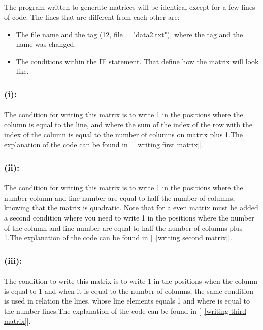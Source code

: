 \documentclass[twocolumn]{article}
\begin{document}
\subsection{}
The program written to generate matrices will be identical except for a few lines of code.
The lines that are different from each other are:
\begin{itemize}
\item The file name and the tag (12, file = "data2.txt"), where the tag and the name was changed.
\item The conditions within the IF statement. That define how the matrix will look like.
\end{itemize}
\subsubsection{(i):}
\paragraph{}
The condition for writing this matrix is to write 1 in the positions where the column is equal to the line, and where the sum of the index of the row with the index of the column is equal to the number of columns on matrix plus 1.The explanation of the code can be found in [~\ref{writing first matrix}].
\subsubsection{(ii):}
\paragraph{}
The condition for writing this matrix is to write 1 in the positions where the number column and line number are equal to half the number of columns, knowing that the matrix is quadratic. Note that for a even matrix  must be added a second condition where you need to write 1 in the positions where the number of the column and line number are equal to half the number of columns plus 1.The explanation of the code can be found in [~\ref{writing second matrix}].
\subsubsection{(iii):}
\paragraph{}
The condition to write this matrix is to write 1 in the positions when the column is equal to 1 and when it is equal to the number of columns, the same condition is used in relation the lines, whose line elements equals 1 and where is equal to the number lines.The explanation of the code can be found in [~\ref{writing third matrix}].
\end{document}
